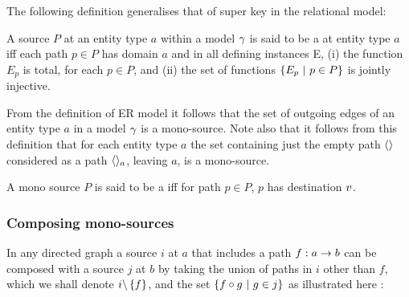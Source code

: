 The following definition generalises that of super key in the relational model:
\begin{definition}
A source $P$  at an entity type $a$ within a model $\gamma$ is said to be a  at entity type $a$ iff each path $p \in P$ has domain $a$ and  in all defining instances E, 
(i) the function $E_p$ is total, for each $p \in P$, and (ii) the set of functions
$\left\{E_p \ \middle|\ p\in P\right\}$ is jointly injective.
\end{definition}



From the definition of ER model it follows that the set of outgoing edges of an entity type 
$a$ in a model $\gamma$ is a mono-source. Note also that it follows from this definition that for each entity type $a$ the set containing just
the empty path $\langle\rangle$ considered as a path $\langle\rangle_a$, leaving $a$, is a mono-source.  
\begin{definition}
A mono source $P$ is said to be a  iff for path $p \in P$, $p$ has destination $v$.
\end{definition}




\subsubsection{Composing mono-sources}

In any directed graph a source $i$ at $a$ that includes a path $f:a \rightarrow b$ can be composed with a source $j$ at $b$ by taking the union of paths in $i$ other than $f$, which we shall denote $i\backslash \left\{f\right\}$, and the set $\left\{f \circ g \ \middle|\ g \in j\right\}$ as illustrated here :


